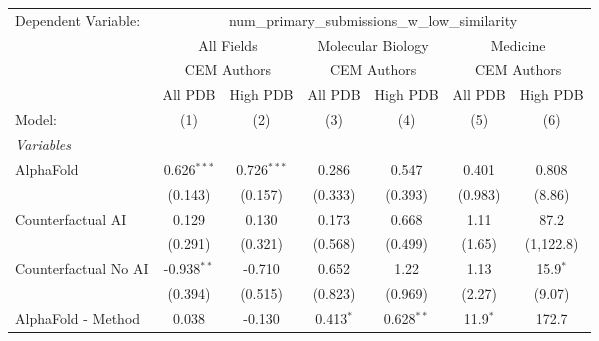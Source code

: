 \begingroup
\centering
\begin{tabular}{lcccccc}
   \tabularnewline \midrule \midrule
   Dependent Variable: & \multicolumn{6}{c}{num\_primary\_submissions\_w\_low\_similarity}\\
 & \multicolumn{2}{c}{All Fields} & \multicolumn{2}{c}{Molecular Biology} & \multicolumn{2}{c}{Medicine} \\
\cmidrule(lr){2-3} \cmidrule(lr){4-5} \cmidrule(lr){6-7}
 & \multicolumn{2}{c}{CEM Authors} & \multicolumn{2}{c}{CEM Authors} & \multicolumn{2}{c}{CEM Authors} \\
\cmidrule(lr){2-3} \cmidrule(lr){4-5} \cmidrule(lr){6-7}
 & \multicolumn{1}{c}{All PDB} & \multicolumn{1}{c}{High PDB} & \multicolumn{1}{c}{All PDB} & \multicolumn{1}{c}{High PDB} & \multicolumn{1}{c}{All PDB} & \multicolumn{1}{c}{High PDB} \\
\cmidrule(lr){2-2} \cmidrule(lr){3-3} \cmidrule(lr){4-4} \cmidrule(lr){5-5} \cmidrule(lr){6-6} \cmidrule(lr){7-7}
   Model:                                                     & (1)           & (2)           & (3)           & (4)           & (5)           & (6)\\  
   \midrule
   \emph{Variables}\\
   AlphaFold                                                  & 0.626$^{***}$ & 0.726$^{***}$ & 0.286         & 0.547         & 0.401         & 0.808\\   
                                                              & (0.143)       & (0.157)       & (0.333)       & (0.393)       & (0.983)       & (8.86)\\   
   Counterfactual AI                                          & 0.129         & 0.130         & 0.173         & 0.668         & 1.11          & 87.2\\   
                                                              & (0.291)       & (0.321)       & (0.568)       & (0.499)       & (1.65)        & (1,122.8)\\   
   Counterfactual No AI                                       & -0.938$^{**}$ & -0.710        & 0.652         & 1.22          & 1.13          & 15.9$^{*}$\\   
                                                              & (0.394)       & (0.515)       & (0.823)       & (0.969)       & (2.27)        & (9.07)\\   
   AlphaFold - Method                                         & 0.038         & -0.130        & 0.413$^{*}$   & 0.628$^{**}$  & 11.9$^{*}$    & 172.7\\   

\end{tabular}
